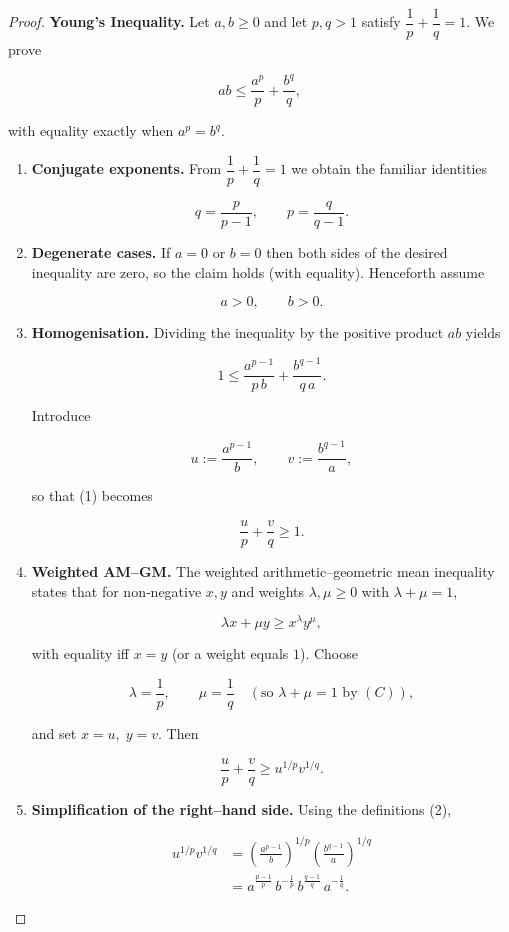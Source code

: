 \begin{proof}
\textbf{Young’s Inequality.}  
Let \(a,b\ge0\) and let \(p,q>1\) satisfy \(\dfrac1p+\dfrac1q=1\).  
We prove  

\[
ab\le\frac{a^{p}}{p}+\frac{b^{q}}{q},
\]

with equality exactly when \(a^{p}=b^{q}\).

\begin{enumerate}
\item \textbf{Conjugate exponents.}  
From \(\dfrac1p+\dfrac1q=1\) we obtain the familiar identities  

\[
q=\frac{p}{p-1},\qquad p=\frac{q}{q-1}. \tag{C}
\]

\item \textbf{Degenerate cases.}  
If \(a=0\) or \(b=0\) then both sides of the desired inequality are zero, so the claim holds (with equality).  
Henceforth assume  

\[
a>0,\qquad b>0. \tag{D}
\]

\item \textbf{Homogenisation.}  
Dividing the inequality by the positive product \(ab\) yields  

\[
1\le\frac{a^{p-1}}{p\,b}+\frac{b^{q-1}}{q\,a}. \tag{1}
\]

Introduce  

\[
u:=\frac{a^{p-1}}{b},\qquad v:=\frac{b^{q-1}}{a}, \tag{2}
\]

so that (1) becomes  

\[
\frac{u}{p}+\frac{v}{q}\ge1. \tag{3}
\]

\item \textbf{Weighted AM–GM.}  
The weighted arithmetic–geometric mean inequality states that for non‑negative \(x,y\) and weights \(\lambda,\mu\ge0\) with \(\lambda+\mu=1\),

\[
\lambda x+\mu y\ge x^{\lambda}y^{\mu},
\]

with equality iff \(x=y\) (or a weight equals \(1\)).  
Choose  

\[
\lambda=\frac1p,\qquad \mu=\frac1q
\quad(\text{so }\lambda+\mu=1\text{ by }(C)),
\]

and set \(x=u,\;y=v\).  Then

\[
\frac{u}{p}+\frac{v}{q}\ge u^{1/p}v^{1/q}. \tag{4}
\]

\item \textbf{Simplification of the right–hand side.}  
Using the definitions (2),

\[
\begin{aligned}
u^{1/p}v^{1/q}
&=\left(\frac{a^{p-1}}{b}\right)^{\!1/p}
  \left(\frac{b^{q-1}}{a}\right)^{\!1/q} \\[2mm]
&=a^{\frac{p-1}{p}}\,b^{-\frac1p}\,
  b^{\frac{q-1}{q}}\,a^{-\frac1q}.
\end{aligned}
\]


\end{enumerate}
\end{proof}
